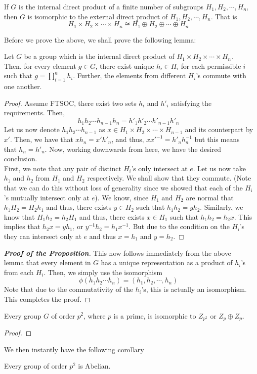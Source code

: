 \begin{proposition}
	If $G$ is the internal direct product of a finite number of subgroups $H_1,H_2,\cdots,H_n$, then $G$ is isomorphic to the external direct product of $H_1,H_2,\cdots,H_n$. That is 
	$$
	H_1\times H_2\times\cdots\times H_n \cong H_1\oplus H_2\oplus\cdots\oplus H_n
	$$
\end{proposition}
Before we prove the above, we shall prove the following lemma:
\begin{lemma}
	Let $G$ be a group which is the internal direct product of $H_1\times H_2\times\cdots\times H_n$. Then, for every element $g\in G$, there exist unique $h_i\in H_i$ for each permissible $i$ such that $g = \prod_{i=1}^{n}h_{i}$. Further, the elements from different $H_i$'s commute with one another.
\end{lemma}
\begin{proof}
	Assume FTSOC, there exist two sets $h_i$ and $h'_i$ satisfying the requirements. Then,
	$$
	h_1h_2\cdots h_{n-1}h_n = h'_1h'_2\cdots h'_{n-1}h'_n
	$$
	Let us now denote $h_1h_2\cdots h_{n-1}$ as $x\in H_1\times H_2\times\cdots\times H_{n-1}$ and its counterpart by $x'$. Then, we have that $xh_n=x'h'_n$, and thus, $xx'^{-1}=h'_{n}h_{n}^{-1}$ but this means that $h_{n}=h'_{n}$. Now, working downwards from here, we have the desired conclusion.\\
	First, we note that any pair of distinct $H_i$'s only intersect at $e$. Let us now take $h_1$ and $h_2$ from $H_1$ and $H_2$ respectively. We shall show that they commute. (Note that we can do this without loss of generality since we showed that each of the $H_i$'s mutually intersect only at $e$). We know, since $H_1$ and $H_2$ are normal that $h_1H_2=H_2h_1$ and thus, there exists $y\in H_2$ such that $h_1h_2=yh_2$. Similarly, we know that $H_1h_2=h_2H_1$ and thus, there exists $x\in H_1$ such that $h_1h_2=h_2x$. This implies that $h_2x=yh_1$, or $y^{-1}h_2=h_1x^{-1}$. But due to the condition on the $H_i$'s they can intersect only at $e$ and thus $x=h_1$ and $y=h_2$. 
\end{proof}
\begin{proof}[\bfseries Proof of the Proposition]
	This now follows immediately from the above lemma that every element in $G$ has a unique representation as a product of $h_i$'s from each $H_i$. Then, we simply use the isomorphism
	$$
	\phi(h_1h_2\cdots h_n) = \left(h_1,h_2,\cdots,h_n\right)
	$$
	Note that due to the commutativity of the $h_i$'s, this is actually an isomorphism.
	This completes the proof.
\end{proof}

\begin{proposition}
	Every group $G$ of order $p^2$, where $p$ is a prime, is isomorphic to $Z_{p^2}$ or $Z_p\oplus Z_p$. 
\end{proposition}
\begin{proof}
\end{proof}

We then instantly have the following corollary
\begin{corollary}
	Every group of order $p^2$ is Abelian.
\end{corollary}